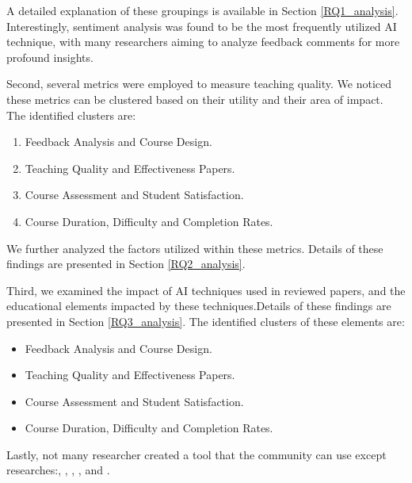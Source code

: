 \documentclass{svproc}
\begin{document}
A detailed explanation of these groupings is available in Section \ref{RQ1_analysis}. Interestingly, sentiment analysis was found to be the most frequently utilized AI technique, with many researchers aiming to analyze feedback comments for more profound insights.

Second, several metrics were employed to measure teaching quality. We noticed these metrics can be clustered based on their utility and their area of impact. The identified clusters are:

\begin{enumerate}
  \item Feedback Analysis and Course Design.
  \item Teaching Quality and Effectiveness Papers.
  \item Course Assessment and Student Satisfaction.
  \item Course Duration, Difficulty and Completion Rates.
\end{enumerate}

We further analyzed the factors utilized within these metrics. Details of these findings are presented in Section \ref{RQ2_analysis}.

Third, we examined the impact of AI techniques used in reviewed papers, and the educational elements impacted by these techniques.Details of these findings are presented in Section \ref{RQ3_analysis}. The identified clusters of these elements are:

\begin{itemize}
  \item Feedback Analysis and Course Design.
  \item Teaching Quality and Effectiveness Papers.
  \item Course Assessment and Student Satisfaction.
  \item Course Duration, Difficulty and Completion Rates.
\end{itemize}

Lastly, not many researcher created a tool that the community can use except researches:\cite{Palaute:_An_Online_Text_Mining_Tool_for_Analyzing_Written_Student_Course_Feedback},
\cite{SUFAT_An_Analytics_Tool_for_Gaining_Insights_from_Student_Feedback_Comments},
\cite{Online_reviews_evaluation_system_for_higher_education_institution:_An_aspect_based_sentiment_analysis_tool},
\cite{Assessing_learners_satisfaction_in_collaborative_online_courses_through_a_big_data_approach}, and 
\cite{Analyzing_educational_comments_for_topics_and_sentiments:_A_text_analytics_approach}.
\end{document}
